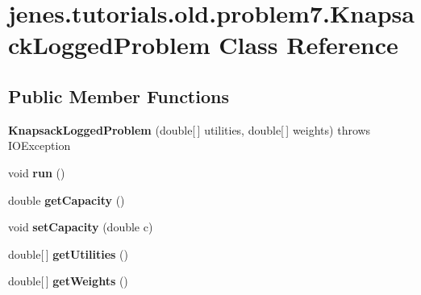 \hypertarget{classjenes_1_1tutorials_1_1old_1_1problem7_1_1_knapsack_logged_problem}{
\section{jenes.tutorials.old.problem7.KnapsackLoggedProblem Class Reference}
\label{classjenes_1_1tutorials_1_1old_1_1problem7_1_1_knapsack_logged_problem}
}
\subsection*{Public Member Functions}
\begin{CompactItemize}
\item 
\hypertarget{classjenes_1_1tutorials_1_1old_1_1problem7_1_1_knapsack_logged_problem_29a58dbca9c08a57879396daab5f3572}{
\textbf{KnapsackLoggedProblem} (double\mbox{[}$\,$\mbox{]} utilities, double\mbox{[}$\,$\mbox{]} weights)  throws IOException }
\label{classjenes_1_1tutorials_1_1old_1_1problem7_1_1_knapsack_logged_problem_29a58dbca9c08a57879396daab5f3572}

\item 
\hypertarget{classjenes_1_1tutorials_1_1old_1_1problem7_1_1_knapsack_logged_problem_56e70b4e2ab15b82fee574fd3221e1c9}{
void \textbf{run} ()}
\label{classjenes_1_1tutorials_1_1old_1_1problem7_1_1_knapsack_logged_problem_56e70b4e2ab15b82fee574fd3221e1c9}

\item 
\hypertarget{classjenes_1_1tutorials_1_1old_1_1problem7_1_1_knapsack_logged_problem_929b6e393d0da3396bd235b10996a1a7}{
double \textbf{getCapacity} ()}
\label{classjenes_1_1tutorials_1_1old_1_1problem7_1_1_knapsack_logged_problem_929b6e393d0da3396bd235b10996a1a7}

\item 
\hypertarget{classjenes_1_1tutorials_1_1old_1_1problem7_1_1_knapsack_logged_problem_f8fef0686eac745e86c82e000d8056f8}{
void \textbf{setCapacity} (double c)}
\label{classjenes_1_1tutorials_1_1old_1_1problem7_1_1_knapsack_logged_problem_f8fef0686eac745e86c82e000d8056f8}

\item 
\hypertarget{classjenes_1_1tutorials_1_1old_1_1problem7_1_1_knapsack_logged_problem_6f9e4d8876f6df43cfbd03f8981cf2e2}{
double\mbox{[}$\,$\mbox{]} \textbf{getUtilities} ()}
\label{classjenes_1_1tutorials_1_1old_1_1problem7_1_1_knapsack_logged_problem_6f9e4d8876f6df43cfbd03f8981cf2e2}

\item 
\hypertarget{classjenes_1_1tutorials_1_1old_1_1problem7_1_1_knapsack_logged_problem_544b9df22c87570cbbe5636ba3af9a10}{
double\mbox{[}$\,$\mbox{]} \textbf{getWeights} ()}
\label{classjenes_1_1tutorials_1_1old_1_1problem7_1_1_knapsack_logged_problem_544b9df22c87570cbbe5636ba3af9a10}

\end{CompactItemize}

